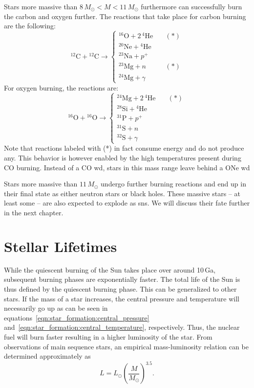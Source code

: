Stars more massive than $8\,M_\odot < M < 11\,M_\odot$ furthermore can successfully burn the carbon and oxygen further. The reactions that take place for carbon burning are the following:
\begin{equation}
    {^{12}}\mathrm{C} + {^{12}}\mathrm{C} \longrightarrow 
    \begin{cases}
        {^{16}}\mathrm{O} + 2\,{^4}\mathrm{He} \quad &(*)\\
        {^{20}}\mathrm{Ne} + {^4}\mathrm{He}\\
        {^{23}}\mathrm{Na} + p^+\\
        {^{23}}\mathrm{Mg} + n \quad &(*)\\
        {^{24}}\mathrm{Mg} + \gamma
    \end{cases}
\end{equation}
For oxygen burning, the reactions are:
\begin{equation}
{^{16}}\mathrm{O} + {^{16}}\mathrm{O} \longrightarrow 
    \begin{cases}
        {^{24}}\mathrm{Mg} + 2\,{^4}\mathrm{He} \quad & (*)\\
        {^{28}}\mathrm{Si} + {^4}\mathrm{He}\\
        {^{31}}\mathrm{P} + p^+\\
        {^{31}}\mathrm{S} + n\\
        {^{32}}\mathrm{S} + \gamma
    \end{cases}
\end{equation}
Note that reactions labeled with (*) in fact consume energy and do not produce any. This behavior is however enabled by the high temperatures present during CO burning. Instead of a CO \ac{wd}, stars in this mass range leave behind a ONe \ac{wd}

Stars more massive than $11\,M_\odot$ undergo further burning reactions and end up in their final state as either neutron stars or black holes. These massive stars -- at least some -- are also expected to explode as \acp{sn}. We will discuss their fate further in the next chapter.


\section{Stellar Lifetimes}

While the quiescent burning of the Sun takes place over around 10\,Ga, subsequent burning phases are exponentially faster. The total life of the Sun is thus defined by the quiescent burning phase. This can be generalized to other stars. If the mass of a star increases, the central pressure and temperature will necessarily go up as can be seen in equations~\eqref{eqn:star_formation:central_pressure} and~\eqref{eqn:star_formation:central_temperature}, respectively. Thus, the nuclear fuel will burn faster resulting in a higher luminosity of the star. From observations of main sequence stars, an empirical mass-luminosity relation can be determined approximately as
\begin{equation}
    L = L_\odot \left(\frac{M}{M_\odot}\right)^{3.5}. \label{eqn:sun:mass_luminosity_relation}
\end{equation}

